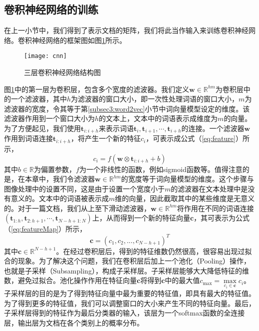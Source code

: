 \subsection{卷积神经网络的训练}
\label{subsec3:cnnTraining}
在上一小节中，我们得到了表示文档的矩阵，我们将此当作输入来训练卷积神经网络。卷积神经网络的框架图如图\ref{fig:cnn}所示。

\begin{figure}[!htbp]
  \centering
  \texttt{[image: cnn]}
  \caption{三层卷积神经网络结构图}
  \label{fig:cnn}
\end{figure}

图\ref{fig:cnn}中的第一层为卷积层，包含多个宽度的滤波器。我们定义$\mathbf{w} \in \mathbb{R}^{hm}$为卷积层中的一个滤波器，其中$h$为滤波器的窗口大小，即一次性处理词语的窗口大小，$m$为滤波器的宽度，令其等于第\ref{subsec3:word2vec}小节中词向量模型设定的维度。该滤波器作用到一个窗口大小为$h$的文本上，文本中的词语表示成维度为$m$的向量。为了方便起见，我们使用$\mathbf{t}_{i:i+h}$来表示词语$\mathbf{t}_i, \mathbf{t}_{i+1}, \cdots, \mathbf{t}_{i+h}$的连接。一个滤波器$\mathbf{w}$作用到词语连接$\mathbf{t}_{i:i+h}$，将产生一个新的特征$c_i$，可表示成公式（\ref{eq:feature}）所示，
\begin{equation}
\label{eq:feature}
	c_i=f(\mathbf{w} \otimes \mathbf{t}_{i:i+h} + b)
\end{equation}
其中$b \in \mathbb{R}$为偏置参数，$f$为一个非线性的函数，例如sigmoid函数等。值得注意的是，在本章中，我们令滤波器$\mathbf{w} \in \mathbb{R}^{hm}$的宽度等于词向量模型的维度。这个步骤与图像处理中的设置不同，这是由于设置一个宽度小于$m$的滤波器在文本处理中是没有意义的。文本中的词语被表示成$m$维的向量，因此截取其中的某些维度是无意义的。对于一篇文档，我们从上至下滑动滤波器，$\mathbf{w} \in \mathbb{R}^{hm}$将作用在不同的词语连接$(\mathbf{t}_{1:h}, \mathbf{t}_{2:h + 1}, \cdots, \mathbf{t}_{N - h + 1:N})$上，从而得到一个新的特征向量$\mathbf{c}$，其可表示为公式（\ref{eq:featureMap}）所示，
\begin{equation}
\label{eq:featureMap}
	\mathbf{c}  = ({c_1},{c_2},...,{c_{N - h + 1}})^T
\end{equation}
其中$\mathbf{c} \in \mathbb{R}^{N-h+1}$。在经过卷积层后，得到的特征维数仍然很高，很容易出现过拟合的现象。为了解决这个问题，我们在卷积层后加上一个池化（Pooling）操作，也就是子采样（Subsampling），构成子采样层。子采样层能够大大降低特征的维数，避免过拟合。池化操作作用在特征向量$\mathbf{c}$将得到$\mathbf{c}$中的最大值$c_{\max} = \max\limits_{c_i \in \mathbf{c}} c_i$。子采样层的目的是为了得到特征向量中最为重要的特征值，即具有最大的特征值。为了得到更多的特征值，我们可以调整窗口的大小来产生不同的特征向量。最后，子采样层得到的特征作为最后分类器的输入，该层为一个softmax函数的全连接层，输出层为文档在各个类别上的概率分布。

